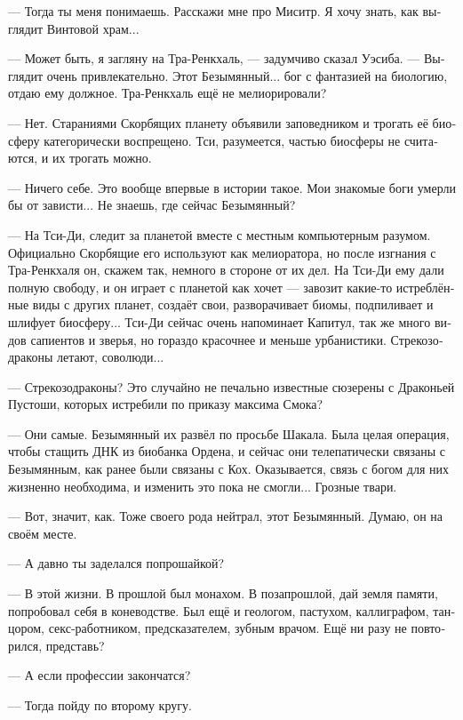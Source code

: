 \documentclass[a4paper,12pt,fleqn]{book}\usepackage{cooltooltips}\usepackage{polyglossia}\setdefaultlanguage[babelshorthands=true]{russian}\setotherlanguage{english}\defaultfontfeatures{Ligatures=TeX,Mapping=tex-text} \usepackage{xcolor}\definecolor{lightgray}{HTML}{bbbbbb}\color{lightgray}\newcommand{\ml}[3]{\textenglish{\textcolor{black}{#3}}}
\newcommand{\asterism}{\vspace{1em}{\centering\Large\bfseries$\ast~\ast~\ast$\par}\vspace{1em}}
\begin{document}
--- Тогда ты меня понимаешь.
Расскажи мне про Миситр.
Я хочу знать, как выглядит Винтовой храм...

\asterism

--- Может быть, я загляну на Тра-Ренкхаль, --- задумчиво сказал Уэсиба.
--- Выглядит очень привлекательно.
Этот Безымянный... бог с фантазией на биологию, отдаю ему должное.
Тра-Ренкхаль ещё не мелиорировали?

--- Нет.
Стараниями Скорбящих планету объявили заповедником и трогать её биосферу категорически воспрещено.
Тси, разумеется, частью биосферы не считаются, и их трогать можно.

--- Ничего себе.
Это вообще впервые в истории такое.
Мои знакомые боги умерли бы от зависти...
Не знаешь, где сейчас Безымянный?

--- На Тси-Ди, следит за планетой вместе с местным компьютерным разумом.
Официально Скорбящие его используют как мелиоратора, но после изгнания с Тра-Ренкхаля он, скажем так, немного в стороне от их дел.
На Тси-Ди ему дали полную свободу, и он играет с планетой как хочет --- завозит какие-то истреблённые виды с других планет, создаёт свои, разворачивает биомы, подпиливает и шлифует биосферу...
Тси-Ди сейчас очень напоминает Капитул, так же много видов сапиентов и зверья, но гораздо красочнее и меньше урбанистики.
Стрекозодраконы летают, соволюди...

--- Стрекозодраконы?
Это случайно не печально известные сюзерены с Драконьей Пустоши, которых истребили по приказу максима Смока?

--- Они самые.
Безымянный их развёл по просьбе Шакала.
Была целая операция, чтобы стащить ДНК из биобанка Ордена, и сейчас они телепатически связаны с Безымянным, как ранее были связаны с Кох.
Оказывается, связь с богом для них жизненно необходима, и изменить это пока не смогли...
Грозные твари.

--- Вот, значит, как.
Тоже своего рода нейтрал, этот Безымянный.
Думаю, он на своём месте.

--- А давно ты заделался попрошайкой?

--- В этой жизни.
В прошлой был монахом.
В позапрошлой, дай земля памяти, попробовал себя в коневодстве.
Был ещё и геологом, пастухом, каллиграфом, танцором, секс-работником, предсказателем, зубным врачом.
Ещё ни разу не повторился, представь?

--- А если профессии закончатся?

--- Тогда пойду по второму кругу.

\asterism
\end{document}
